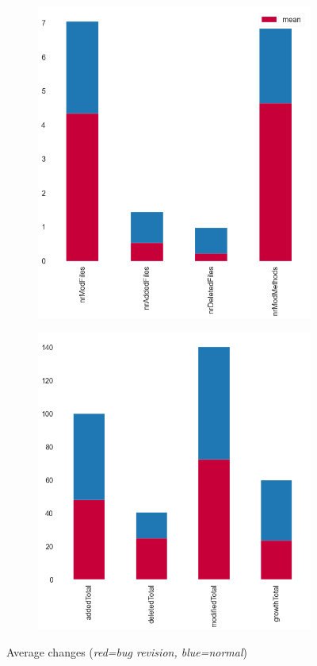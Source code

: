  \begin{figure}[H]
	\begin{subfigure}{.5\textwidth}
		\centering
		\includegraphics[scale=0.3]{./src/data_analysis/rev_files.png}
	\end{subfigure}%
	\begin{subfigure}{.5\textwidth}
		\centering
		\includegraphics[scale=0.3]{./src/data_analysis/rev_lines.png}
	\end{subfigure}
	\caption{Average changes (\textit{red=bug revision, blue=normal})}
	\label{rev_changes}
\end{figure}

